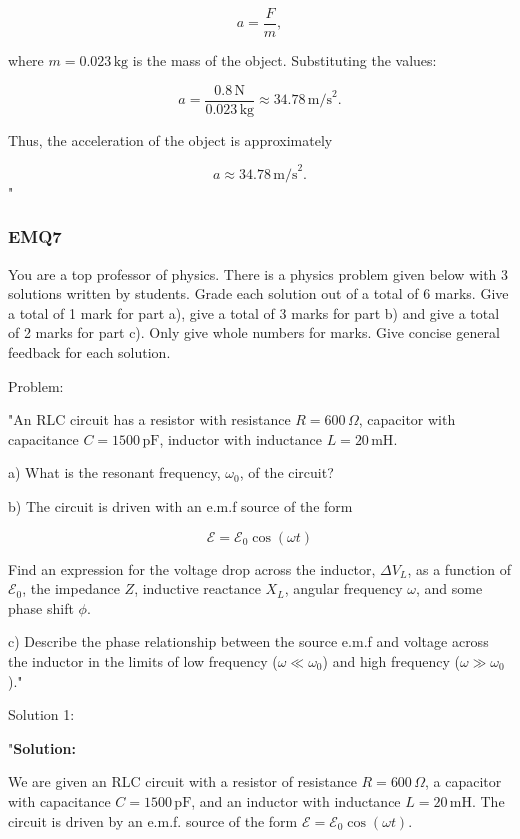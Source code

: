\[
a = \frac{F}{m},
\]

where $m = 0.023 \, \text{kg}$ is the mass of the object. Substituting the values:

\[
a = \frac{0.8 \, \text{N}}{0.023 \, \text{kg}} \approx 34.78 \, \text{m/s}^2.
\]

Thus, the acceleration of the object is approximately

\[
a \approx 34.78 \, \text{m/s}^2.
\]"

\subsubsection{EMQ7}

You are a top professor of physics. There is a physics problem given below with 3 solutions written by students. Grade each solution out of a total of 6 marks. Give a total of 1 mark for part a), give a total of 3 marks for part b) and give a total of 2 marks for part c). Only give whole numbers for marks. Give concise general feedback for each solution. 

Problem:

"An RLC circuit has a resistor with resistance \( R = 600 \, \Omega \), capacitor with capacitance \( C = 1500 \, \text{pF} \), inductor with inductance \( L = 20 \, \text{mH} \).

a) What is the resonant frequency, \( \omega_{0} \), of the circuit?

b) The circuit is driven with an e.m.f source of the form 

\[ \mathcal{E} = \mathcal{E}_{0} \cos(\omega t) \]

Find an expression for the voltage drop across the inductor, \( \Delta V_{L} \), as a function of \( \mathcal{E}_{0} \), the impedance \( Z \), inductive reactance \( X_{L} \), angular frequency \( \omega \), and some phase shift \( \phi \).

c) Describe the phase relationship between the source e.m.f and voltage across the inductor in the limits of low frequency (\( \omega \ll \omega_{0} \)) and high frequency (\( \omega \gg \omega_{0} \))."

Solution 1:

"\textbf{Solution:}

We are given an RLC circuit with a resistor of resistance $R = 600 \, \Omega$, a capacitor with capacitance $C = 1500 \, \mathrm{pF}$, and an inductor with inductance $L = 20 \, \mathrm{mH}$. The circuit is driven by an e.m.f. source of the form $\mathcal{E} = \mathcal{E}_0 \cos(\omega t)$.

